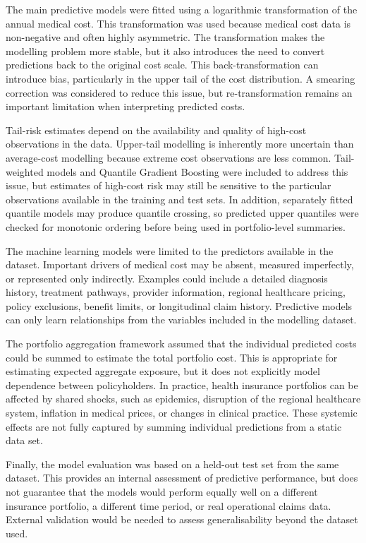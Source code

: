 	The main predictive models were fitted using a logarithmic transformation of the annual medical cost. This transformation was used because medical cost data is non-negative and often highly asymmetric. The transformation makes the modelling problem more stable, but it also introduces the need to convert predictions back to the original cost scale. This back-transformation can introduce bias, particularly in the upper tail of the cost distribution. A smearing correction was considered to reduce this issue, but re-transformation remains an important limitation when interpreting predicted costs.
	
	Tail-risk estimates depend on the availability and quality of high-cost observations in the data. Upper-tail modelling is inherently more uncertain than average-cost modelling because extreme cost observations are less common. Tail-weighted models and Quantile Gradient Boosting were included to address this issue, but estimates of high-cost risk may still be sensitive to the particular observations available in the training and test sets. In addition, separately fitted quantile models may produce quantile crossing, so predicted upper quantiles were checked for monotonic ordering before being used in portfolio-level summaries.
	
	The machine learning models were limited to the predictors available in the dataset. Important drivers of medical cost may be absent, measured imperfectly, or represented only indirectly. Examples could include a detailed diagnosis history, treatment pathways, provider information, regional healthcare pricing, policy exclusions, benefit limits, or longitudinal claim history. Predictive models can only learn relationships from the variables included in the modelling dataset.
	
	The portfolio aggregation framework assumed that the individual predicted costs could be summed to estimate the total portfolio cost. This is appropriate for estimating expected aggregate exposure, but it does not explicitly model dependence between policyholders. In practice, health insurance portfolios can be affected by shared shocks, such as epidemics, disruption of the regional healthcare system, inflation in medical prices, or changes in clinical practice. These systemic effects are not fully captured by summing individual predictions from a static data set.
	
	Finally, the model evaluation was based on a held-out test set from the same dataset. This provides an internal assessment of predictive performance, but does not guarantee that the models would perform equally well on a different insurance portfolio, a different time period, or real operational claims data. External validation would be needed to assess generalisability beyond the dataset used.
	
